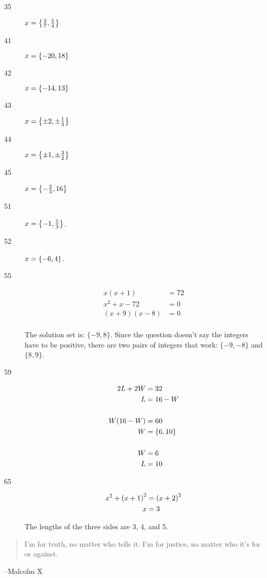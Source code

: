 \documentclass[letterpaper, landscape]{exam}
\begin{document}
\begin{description}
      \item[35] $x = \cbr{ \frac{3}{7}, \frac{5}{4} }$

      \item[41] $x = \cbr{ -20, 18 }$

      \item[42] $x = \cbr{ -14, 13 }$

      \item[43] $x = \cbr{ \pm 2, \pm \frac{1}{3} }$

      \item[44] $x = \cbr{ \pm 1, \pm \frac{3}{2} }$

      \item[45] $x = \cbr{ - \frac{2}{3}, 16 }$

      \item[51] $x = \cbr{ -1, \frac{5}{3} }$.

      \item[52] $x = \cbr{-6, 4}$.

      \item[55]
        \begin{align*}
          x(x + 1)       & = 72 \\
          x^2 + x - 72   & = 0 \\
          (x + 9)(x - 8) & = 0 \\
        \end{align*}

        The solution set is: $\{-9, 8\}$.  Since the question doesn't say the
        integers have to be positive, there are two pairs of integers that work:
        $\{-9, -8\}$ and $\{8, 9\}$.

      \item[59]
        \begin{align*}
          2L + 2W & = 32 \\
          L       & = 16 - W \\
          \\
          W(16 - W) & = 60 \\
          W         & = \cbr{ 6, 10 } \\
          \\
          W & = 6 \\
          L & = 10 \\
        \end{align*}
        
      \item[65]
        \begin{align*}
          x^2 + \del{x + 1}^2 & = \del{x + 2}^2 \\
          x                   & = 3 \\
        \end{align*}

        The lengths of the three sides are 3, 4, and 5.
        
    \end{description}

  \fi
  \ifprintanswers{}
  \else
    \vspace{9 cm}
    \begin{quote}
      \begin{em}
        I'm for truth, no matter who tells it. I'm for justice, no matter who it's for or against.
      \end{em}
    \end{quote}
    \hspace{2 cm}--Malcolm X
  \fi
\end{document}
